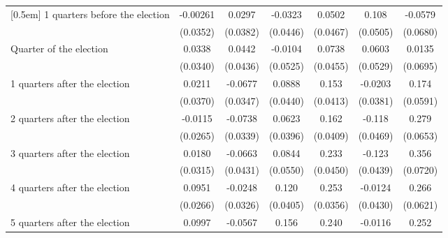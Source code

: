 \begin{table}[!ht]
\begin{tabular}{l*{6}{c}}
[0.5em]
 1 quarters before the election&    -0.00261         &      0.0297         &     -0.0323         &      0.0502         &       0.108\sym{*}  &     -0.0579         \\
                    &    (0.0352)         &    (0.0382)         &    (0.0446)         &    (0.0467)         &    (0.0505)         &    (0.0680)         \\
[0.5em]
Quarter of the election&      0.0338         &      0.0442         &     -0.0104         &      0.0738         &      0.0603         &      0.0135         \\
                    &    (0.0340)         &    (0.0436)         &    (0.0525)         &    (0.0455)         &    (0.0529)         &    (0.0695)         \\
[0.5em]
 1 quarters after the election&      0.0211         &     -0.0677         &      0.0888\sym{*}  &       0.153\sym{***}&     -0.0203         &       0.174\sym{**} \\
                    &    (0.0370)         &    (0.0347)         &    (0.0440)         &    (0.0413)         &    (0.0381)         &    (0.0591)         \\
[0.5em]
 2 quarters after the election&     -0.0115         &     -0.0738\sym{*}  &      0.0623         &       0.162\sym{***}&      -0.118\sym{*}  &       0.279\sym{***}\\
                    &    (0.0265)         &    (0.0339)         &    (0.0396)         &    (0.0409)         &    (0.0469)         &    (0.0653)         \\
[0.5em]
 3 quarters after the election&      0.0180         &     -0.0663         &      0.0844         &       0.233\sym{***}&      -0.123\sym{**} &       0.356\sym{***}\\
                    &    (0.0315)         &    (0.0431)         &    (0.0550)         &    (0.0450)         &    (0.0439)         &    (0.0720)         \\
[0.5em]
 4 quarters after the election&      0.0951\sym{***}&     -0.0248         &       0.120\sym{**} &       0.253\sym{***}&     -0.0124         &       0.266\sym{***}\\
                    &    (0.0266)         &    (0.0326)         &    (0.0405)         &    (0.0356)         &    (0.0430)         &    (0.0621)         \\
[0.5em]
 5 quarters after the election&      0.0997\sym{***}&     -0.0567         &       0.156\sym{***}&       0.240\sym{***}&     -0.0116         &       0.252\sym{***}\\

\end{tabular}
\end{table}
